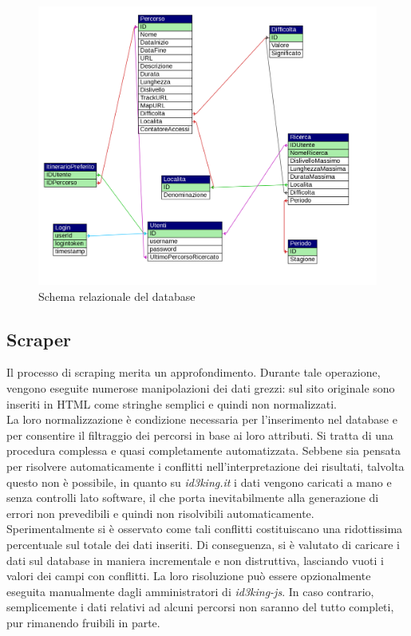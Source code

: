\documentclass[11pt]{report}
\begin{document}
\begin{figure}[h]
	\centering
	\includegraphics[scale=0.45]{DB_schema}
	\caption{Schema relazionale del database \label{db_schema}}
\end{figure}
\subsection{Scraper}
Il processo di scraping merita un approfondimento.
Durante tale operazione, vengono eseguite numerose manipolazioni dei dati grezzi: sul sito originale sono inseriti in HTML come stringhe semplici e quindi non normalizzati.
\\La loro normalizzazione è condizione necessaria per l'inserimento nel database e per consentire il filtraggio dei percorsi in base ai loro attributi.
Si tratta di una procedura complessa e quasi completamente automatizzata.
Sebbene sia pensata per risolvere automaticamente i conflitti nell'interpretazione dei risultati, talvolta questo non è possibile, in quanto su \textit{id3king.it} i dati vengono caricati a mano e senza controlli lato software, il che porta inevitabilmente alla generazione di errori non prevedibili e quindi non risolvibili automaticamente.
\\Sperimentalmente si è osservato come tali conflitti costituiscano una ridottissima percentuale sul totale dei dati inseriti.
Di conseguenza, si è valutato di caricare i dati sul database in maniera incrementale e non distruttiva, lasciando vuoti i valori dei campi con conflitti.
La loro risoluzione può essere opzionalmente eseguita manualmente dagli amministratori di \textit{id3king-js}.
In caso contrario, semplicemente i dati relativi ad alcuni percorsi non saranno del tutto completi, pur rimanendo fruibili in parte.
\end{document}
